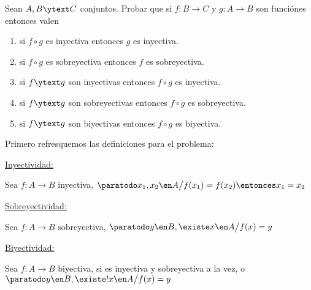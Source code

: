 \begin{enunciado}{\ejercicio}
  Sean $A, B \ytext C$ conjuntos. Probar que si $f: B \to C$ y $g: A \to B$ son funciónes entonces valen
  \begin{enumerate}[label=\roman*), itemsep = -5pt]
    \item si $f \circ g$ es inyectiva entonces $g$ es inyectiva.
    \item si $f \circ g$ es sobreyectiva entonces $f$ es sobreyectiva.
    \item si $f \ytext g$ son inyectivas entonces $f \circ g$ es inyectiva.
    \item si $f \ytext g$ son sobreyectivas entonces $f \circ g$ es sobreyectiva.
    \item si $f \ytext g$ son biyectivas entonces $f \circ g$ es biyectiva.
  \end{enumerate}
\end{enunciado}

Primero refresquemos las definiciones para el problema:

\underline{Inyectividad:}
\begin{center}
  Sea $f:A \to B$ inyectiva,  $\paratodo x_1, x_2 \en A \big/ f(x_1) = f(x_2) \entonces x_1 = x_2$ \vspace{0.25em}
\end{center}

\underline{Sobreyectividad:}
\begin{center}
  Sea $f:A \to B$ sobreyectiva, $\paratodo y \en B, \existe x \en A \big/ f(x) = y$ \vspace{0.25em}
\end{center}

\underline{Biyectividad:}
\begin{center}
  Sea $f:A \to B$ biyectiva, si es inyectiva y sobreyectiva a la vez, o $\paratodo y \en B, \existe! x \en A \big/ f(x) = y$
\end{center}


